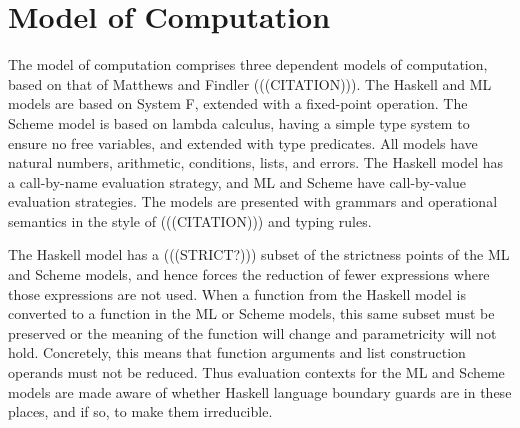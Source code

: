 \newcommand{\haskell}{Haskell model\xspace}
\newcommand{\ml}{ML model\xspace}
\newcommand{\scheme}{Scheme model\xspace}

\newcommand{\haskellml}{Haskell and ML models\xspace}
\newcommand{\haskellmlscheme}{Haskell, ML, and Scheme models\xspace}

\newcommand{\articlehaskell}[1]{#1 \haskell}
\newcommand{\articleml}[1]{#1 \ml}
\newcommand{\articlescheme}[1]{#1 \scheme}

\newcommand{\articlehaskellml}[1]{#1 \haskellml}
\newcommand{\articlehaskellmlscheme}[1]{#1 \haskellmlscheme}

\newcommand{\thehaskell}{\articlehaskell{the}}
\newcommand{\Thehaskell}{\articlehaskell{The}}
\newcommand{\theml}{\articleml{the}}
\newcommand{\Theml}{\articleml{The}}
\newcommand{\thescheme}{\articlescheme{the}}
\newcommand{\Thescheme}{\articlescheme{The}}

\newcommand{\thehaskellml}{\articlehaskellml{the}}
\newcommand{\Thehaskellml}{\articlehaskellml{The}}
\newcommand{\thehaskellmlscheme}{\articlehaskellmlscheme{the}}
\newcommand{\Thehaskellmlscheme}{\articlehaskellmlscheme{The}}

\newcommand{\hastype}[1]{has the type #1}
\newcommand{\havetype}[1]{have the type #1}

\section{Model of Computation}

The model of computation comprises three dependent models of computation, based on that of Matthews and Findler (((CITATION))). The Haskell and ML models are based on System F, extended with a fixed-point operation. The Scheme model is based on lambda calculus, having a simple type system to ensure no free variables, and extended with type predicates. All models have natural numbers, arithmetic, conditions, lists, and errors. The Haskell model has a call-by-name evaluation strategy, and ML and Scheme have call-by-value evaluation strategies. The models are presented with grammars and operational semantics in the style of (((CITATION))) and typing rules.

The Haskell model has a (((STRICT?))) subset of the strictness points of the ML and Scheme models, and hence forces the reduction of fewer expressions where those expressions are not used. When a function from the Haskell model is converted to a function in the ML or Scheme models, this same subset must be preserved or the meaning of the function will change and parametricity will not hold. Concretely, this means that function arguments and list construction operands must not be reduced. Thus evaluation contexts for the ML and Scheme models are made aware of whether Haskell language boundary guards are in these places, and if so, to make them irreducible.


